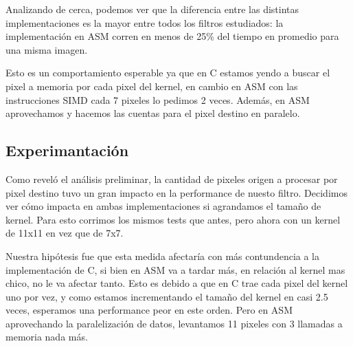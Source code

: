 Analizando de cerca, podemos ver que la diferencia entre las distintas implementaciones es la mayor entre todos los filtros estudiados: la implementación en ASM corren en menos de 25\% del tiempo en promedio para una misma imagen.

Esto es un comportamiento esperable ya que en C estamos yendo a buscar el pixel a memoria por cada pixel del kernel, en cambio en ASM con las instrucciones SIMD cada 7 pixeles lo pedimos 2 veces. Además, en ASM aprovechamos y hacemos las cuentas para el pixel destino en paralelo.

\subsection{Experimantación}
Como reveló el análisis preliminar, la cantidad de pixeles origen a procesar por pixel destino tuvo un gran impacto en la performance de nuesto filtro. Decidimos ver cómo impacta en ambas implementaciones si agrandamos el tamaño de kernel. Para esto corrimos los mismos tests que antes, pero ahora con un kernel de 11x11 en vez que de 7x7.

Nuestra hipótesis fue que esta medida afectaría con más contundencia a la implementación de C, si bien en ASM va a tardar más, en relación al kernel mas chico, no le va afectar tanto. Esto es debido a que en C trae cada pixel del kernel uno por vez, y como estamos incrementando el tamaño del kernel en casi 2.5 veces, esperamos una performance peor en este orden. Pero en ASM aprovechando la paralelización de datos, levantamos 11 pixeles con 3 llamadas a memoria nada más.

